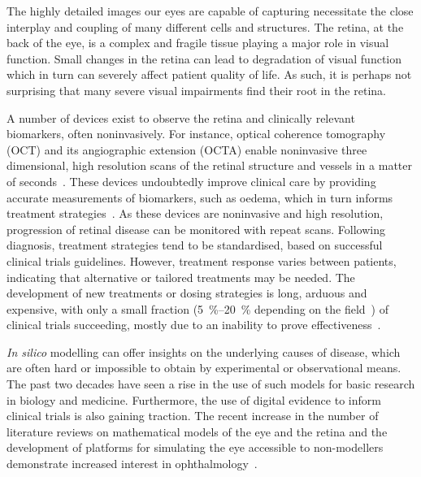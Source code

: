 \documentclass{article}
\begin{document}
The highly detailed images our eyes are capable of capturing necessitate the close interplay and coupling of many different cells and structures.
The retina, at the back of the eye, is a complex and fragile tissue playing a major role in visual function.
Small changes in the retina can lead to degradation of visual function which in turn can severely affect patient quality of life.
As such, it is perhaps not surprising that many severe visual impairments find their root in the retina.

A number of devices exist to observe the retina and clinically relevant biomarkers, often noninvasively.
For instance, optical coherence tomography (OCT) and its angiographic extension (OCTA) enable noninvasive three dimensional, high resolution scans of the retinal structure and vessels in a matter of seconds~\cite{Nanegrungsunk_2022,Spaide_2018}.
These devices undoubtedly improve clinical care by providing accurate measurements of biomarkers, such as oedema, which in turn informs treatment strategies~\cite{Hui_2022}.
As these devices are noninvasive and high resolution, progression of retinal disease can be monitored with repeat scans.
Following diagnosis, treatment strategies tend to be standardised, based on successful clinical trials guidelines.
However, treatment response varies between patients, indicating that alternative or tailored treatments may be needed.
The development of new treatments or dosing strategies is long, arduous and expensive, with only a small fraction (\SIrange{5}{20}{\percent} depending on the field~\cite{Mullard_2016, Wong_2018}) of clinical trials succeeding, mostly due to an inability to prove effectiveness~\cite{Fogel_2018}.

\textit{In silico} modelling can offer insights on the underlying causes of disease, which are often hard or impossible to obtain by experimental or observational means.
The past two decades have seen a rise in the use of such models for basic research in biology and medicine.
Furthermore, the use of digital evidence to inform clinical trials is also gaining traction. 
The recent increase in the number of literature reviews on mathematical models of the eye and the retina and the development of platforms for simulating the eye accessible to non-modellers demonstrate increased interest in ophthalmology~\cite{Arciero_2019,Arciero_2017,Bhandari_2021,Harris_2013,Prudhomme_2021,Roberts_2016,Sala_2018}.
\end{document}
